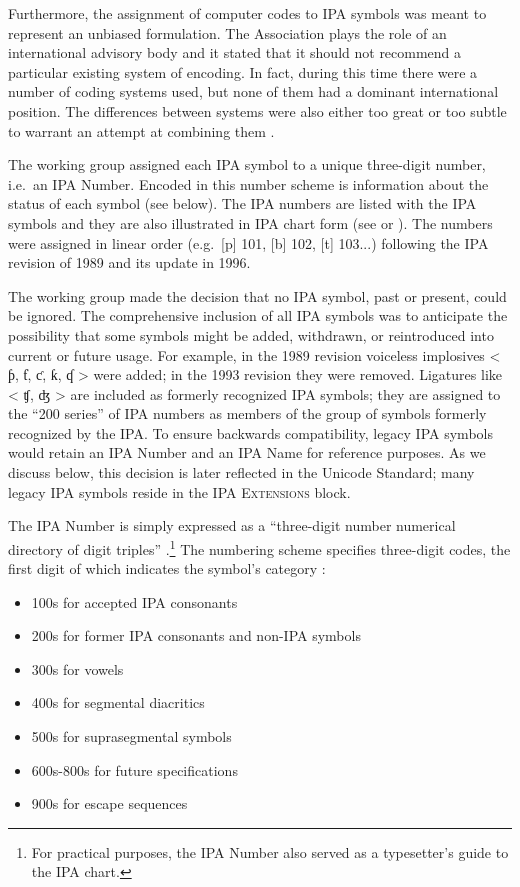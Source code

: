 Furthermore, the assignment of computer codes to IPA symbols was meant to 
represent an unbiased formulation. The Association plays the role of an international 
advisory body and it stated that it should not recommend a particular existing 
system of encoding. In fact, during this time there were a number of coding 
systems used, but none of them had a dominant international position. The 
differences between systems were also either too great or too subtle to warrant 
an attempt at combining them \citep{International1989report}.

The working group assigned each IPA symbol to a unique three-digit number, 
i.e.\ an IPA Number. Encoded in this number scheme is information about the 
status of each symbol (see below). The IPA numbers are listed with the IPA 
symbols and they are also illustrated in IPA chart form (see \cite[84]{EslingGaylord1993} 
or \cite[App. 2]{IPA2007}). The numbers were assigned in linear order (e.g.\ 
[p] 101, [b] 102, [t] 103...) following the IPA revision of 1989 and its update in 1996.

The working group made the decision that no IPA symbol, past or present, 
could be ignored. The comprehensive inclusion of all IPA symbols was to 
anticipate the possibility that some symbols might be added, withdrawn, 
or reintroduced into current or future usage. For example, in the 1989 
revision voiceless implosives < ƥ, ƭ, ƈ, ƙ, ʠ > were added; in the 1993 
revision they were removed. Ligatures like < ʧ, ʤ > are included as formerly 
recognized IPA symbols; they are assigned to the ``200 series'' of IPA numbers 
as members of the group of symbols formerly recognized by the IPA. To ensure 
backwards compatibility, legacy IPA symbols would retain an IPA Number and 
an IPA Name for reference purposes. As we discuss below, this decision is 
later reflected in the Unicode Standard; many legacy IPA symbols reside in 
the \textsc{IPA Extensions} block.

The IPA Number is simply expressed as a ``three-digit number numerical 
directory of digit triples'' \cite{}.\footnote{For practical purposes, 
the IPA Number also served as a typesetter's guide to the IPA chart.} 
The numbering scheme specifies three-digit codes, the first digit of which 
indicates the symbol's category \cite{Esling1990,EslingGaylord1993}:

\begin{itemize}
	\item 100s for accepted IPA consonants
	\item 200s for former IPA consonants and non-IPA symbols
	\item 300s for vowels
	\item 400s for segmental diacritics
	\item 500s for suprasegmental symbols
	\item 600s-800s for future specifications
	\item 900s for escape sequences
\end{itemize}

